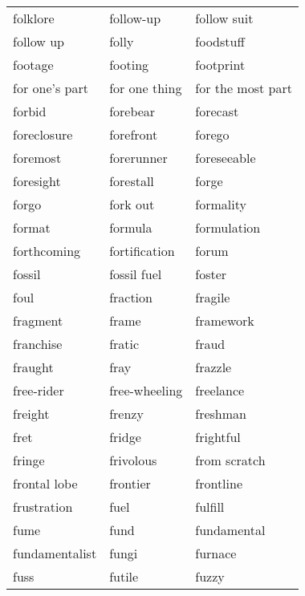 \documentclass{minimal}
\begin{document}
\begin{longtable}{p{2.7cm}@{\hskip 0.2cm}p{2.7cm}@{\hskip 0.2cm}p{2.7cm}}
folklore & follow-up & follow suit \\
follow up & folly & foodstuff \\
footage & footing & footprint \\
for one's part & for one thing & for the most part \\
forbid & forebear & forecast \\
foreclosure & forefront & forego \\
foremost & forerunner & foreseeable \\
foresight & forestall & forge \\
forgo & fork out & formality \\
format & formula & formulation \\
forthcoming & fortification & forum \\
fossil & fossil fuel & foster \\
foul & fraction & fragile \\
fragment & frame & framework \\
franchise & fratic & fraud \\
fraught & fray & frazzle \\
free-rider & free-wheeling & freelance \\
freight & frenzy & freshman \\
fret & fridge & frightful \\
fringe & frivolous & from scratch \\
frontal lobe & frontier & frontline \\
frustration & fuel & fulfill \\
fume & fund & fundamental \\
fundamentalist & fungi & furnace \\
fuss & futile & fuzzy
\end{longtable}
\end{document}

